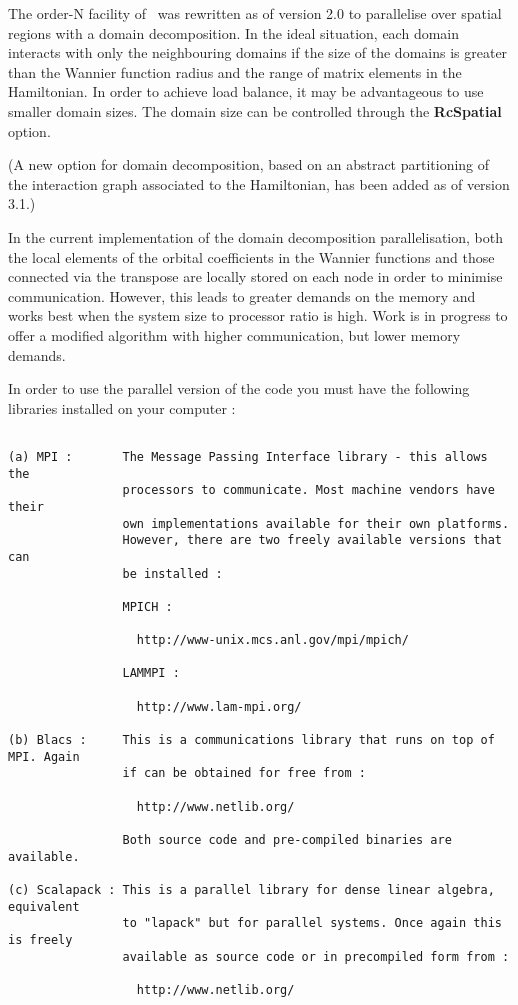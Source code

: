 The order-N facility of \siesta\ was rewritten as of version 2.0
to parallelise over spatial regions with a domain decomposition. In the
ideal situation, each domain interacts with only the neighbouring domains
if the size of the domains is greater than the Wannier function radius and
the range of matrix elements in the Hamiltonian. In order to achieve load
balance, it may be advantageous to use smaller domain sizes. The domain
size can be controlled through the \textbf{RcSpatial} option.

(A new option for domain decomposition, based on an abstract
partitioning of the interaction graph associated to the Hamiltonian,
has been added as of version 3.1.)

In the current implementation of the domain decomposition parallelisation,
both the local elements of the orbital coefficients in the Wannier functions
and those connected via the transpose are locally stored on each node in order
to minimise communication. However, this leads to greater demands on the memory
and works best when the system size to processor ratio is high. Work is in
progress to offer a modified algorithm with higher communication, but lower
memory demands.

In order to use the parallel version of the code you must have the following
libraries installed on your computer :

\begin{verbatim}

(a) MPI :       The Message Passing Interface library - this allows the
                processors to communicate. Most machine vendors have their
                own implementations available for their own platforms.
                However, there are two freely available versions that can
                be installed :

                MPICH :

                  http://www-unix.mcs.anl.gov/mpi/mpich/

                LAMMPI :

                  http://www.lam-mpi.org/

(b) Blacs :     This is a communications library that runs on top of MPI. Again
                if can be obtained for free from :

                  http://www.netlib.org/

                Both source code and pre-compiled binaries are available.

(c) Scalapack : This is a parallel library for dense linear algebra, equivalent
                to "lapack" but for parallel systems. Once again this is freely
                available as source code or in precompiled form from :

                  http://www.netlib.org/

\end{verbatim}

